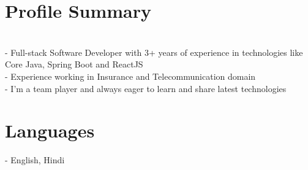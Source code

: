 \documentclass[letterpaper]{twentysecondcv} %
\begin{document}
%

\section{Profile Summary}

\\- Full-stack Software Developer with 3+ years of experience in technologies like Core Java, Spring Boot and ReactJS \\- Experience working in Insurance and Telecommunication domain \\- I’m a team player and always eager to learn and share latest technologies

\section{Languages}

- English, Hindi
%
%
%
%



%
%
\end{document}
